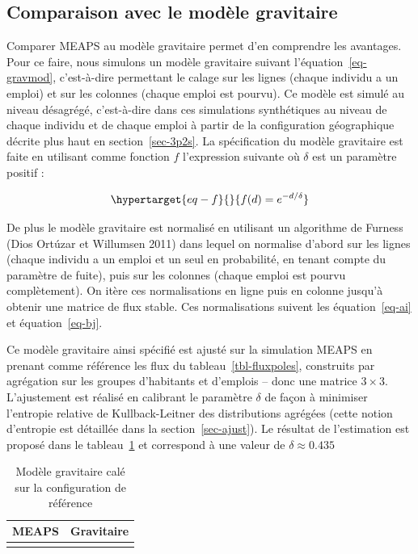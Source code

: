 \documentclass[
  10pt,
  a4paper,
  numbers=noendperiod,
  DIV=9]{scrreprt}
\begin{document}
\hypertarget{comparaison-avec-le-moduxe8le-gravitaire}{%
\subsection{Comparaison avec le modèle
gravitaire}\label{comparaison-avec-le-moduxe8le-gravitaire}}

Comparer MEAPS au modèle gravitaire permet d'en comprendre les
avantages. Pour ce faire, nous simulons un modèle gravitaire suivant
l'équation~\ref{eq-gravmod}, c'est-à-dire permettant le calage sur les
lignes (chaque individu a un emploi) et sur les colonnes (chaque emploi
est pourvu). Ce modèle est simulé au niveau désagrégé, c'est-à-dire dans
ces simulations synthétiques au niveau de chaque individu et de chaque
emploi à partir de la configuration géographique décrite plus haut en
section~\ref{sec-3p2s}. La spécification du modèle gravitaire est faite
en utilisant comme fonction \(f\) l'expression suivante où \(\delta\)
est un paramètre positif :

\begin{equation}\protect\hypertarget{eq-f}{}{
f(d) = e^{-d/\delta}
}\label{eq-f}\end{equation}

De plus le modèle gravitaire est normalisé en utilisant un algorithme de
Furness (Dios Ortúzar et Willumsen 2011) dans lequel on normalise
d'abord sur les lignes (chaque individu a un emploi et un seul en
probabilité, en tenant compte du paramètre de fuite), puis sur les
colonnes (chaque emploi est pourvu complètement). On itère ces
normalisations en ligne puis en colonne jusqu'à obtenir une matrice de
flux stable. Ces normalisations suivent les équation~\ref{eq-ai} et
équation~\ref{eq-bj}.

Ce modèle gravitaire ainsi spécifié est ajusté sur la simulation MEAPS
en prenant comme référence les flux du tableau~\ref{tbl-fluxpoles},
construits par agrégation sur les groupes d'habitants et d'emplois --
donc une matrice \(3 \times 3\). L'ajustement est réalisé en calibrant
le paramètre \(\delta\) de façon à minimiser l'entropie relative de
Kullback-Leitner des distributions agrégées (cette notion d'entropie est
détaillée dans la section~\ref{sec-ajust}). Le résultat de l'estimation
est proposé dans le tableau~\ref{tbl-fluxgrav} et correspond à une
valeur de \(\delta \approx 0.435\)

\hypertarget{tbl-fluxgrav}{}
\begin{longtable}{cc}
\caption{\label{tbl-fluxgrav}Modèle gravitaire calé sur la configuration de référence }\tabularnewline

\toprule
MEAPS & Gravitaire \\ 
\midrule
 &  \\ 
\bottomrule
\end{longtable}
\end{document}
